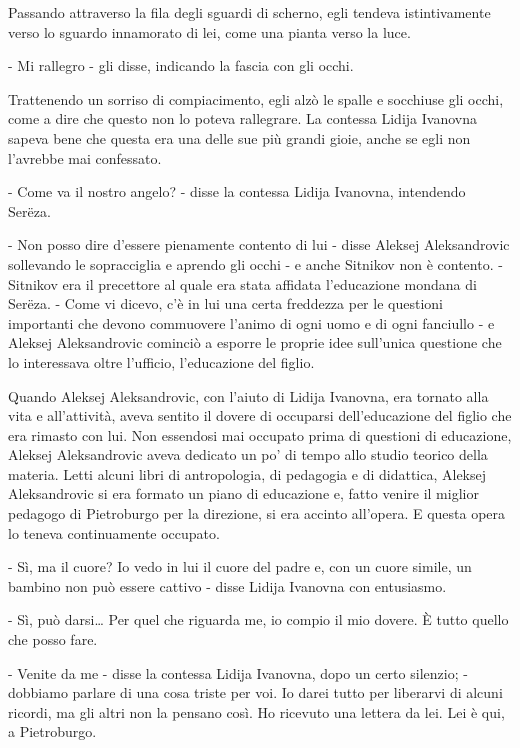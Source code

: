 Passando attraverso la fila degli sguardi di scherno, egli tendeva istintivamente verso lo sguardo innamorato di lei, come una pianta verso la luce. 

- Mi rallegro - gli disse, indicando la fascia con gli occhi. 

Trattenendo un sorriso di compiacimento, egli alzò le spalle e socchiuse gli occhi, come a dire che questo non lo poteva rallegrare. La contessa Lidija Ivanovna sapeva bene che questa era una delle sue più grandi gioie, anche se egli non l'avrebbe mai confessato. 

- Come va il nostro angelo? - disse la contessa Lidija Ivanovna, intendendo Serëza. 

- Non posso dire d'essere pienamente contento di lui - disse Aleksej Aleksandrovic sollevando le sopracciglia e aprendo gli occhi - e anche Sitnikov non è contento. - Sitnikov era il precettore al quale era stata affidata l'educazione mondana di Serëza. - Come vi dicevo, c'è in lui una certa freddezza per le questioni importanti che devono commuovere l'animo di ogni uomo e di ogni fanciullo - e Aleksej Aleksandrovic cominciò a esporre le proprie idee sull'unica questione che lo interessava oltre l'ufficio, l'educazione del figlio. 

Quando Aleksej Aleksandrovic, con l'aiuto di Lidija Ivanovna, era tornato alla vita e all'attività, aveva sentito il dovere di occuparsi dell'educazione del figlio che era rimasto con lui. Non essendosi mai occupato prima di questioni di educazione, Aleksej Aleksandrovic aveva dedicato un po' di tempo allo studio teorico della materia. Letti alcuni libri di antropologia, di pedagogia e di didattica, Aleksej Aleksandrovic si era formato un piano di educazione e, fatto venire il miglior pedagogo di Pietroburgo per la direzione, si era accinto all'opera. E questa opera lo teneva continuamente occupato. 

- Sì, ma il cuore? Io vedo in lui il cuore del padre e, con un cuore simile, un bambino non può essere cattivo - disse Lidija Ivanovna con entusiasmo. 

- Sì, può darsi\ldots{} Per quel che riguarda me, io compio il mio dovere. È tutto quello che posso fare. 

- Venite da me - disse la contessa Lidija Ivanovna, dopo un certo silenzio; - dobbiamo parlare di una cosa triste per voi. Io darei tutto per liberarvi di alcuni ricordi, ma gli altri non la pensano così. Ho ricevuto una lettera da lei. Lei è qui, a Pietroburgo. 

